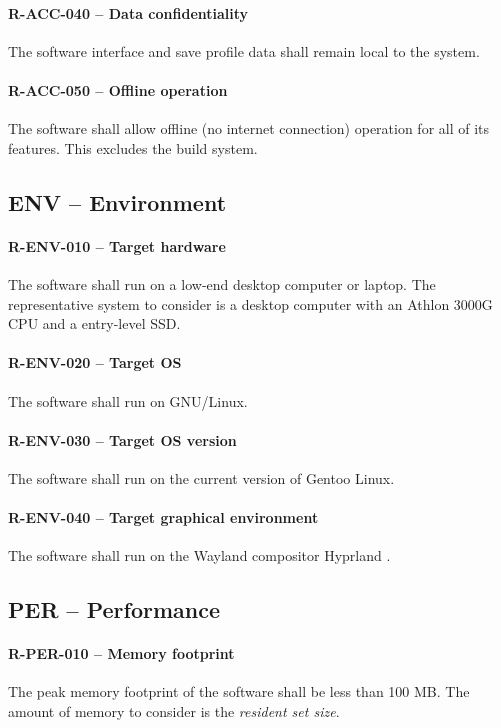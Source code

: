\paragraph{R-ACC-040 -- Data confidentiality}
The software interface and save profile data shall remain local to the system.

\paragraph{R-ACC-050 -- Offline operation}
The software shall allow offline (no internet connection) operation for all of
its features. This excludes the build system.

\subsection{ENV -- Environment}
\paragraph{R-ENV-010 -- Target hardware}
The software shall run on a low-end desktop computer or laptop.
The representative system to consider is a desktop computer with
an Athlon 3000G \gls{CPU} and a entry-level \gls{SSD}.

\paragraph{R-ENV-020 -- Target OS}
The software shall run on GNU/Linux.

\paragraph{R-ENV-030 -- Target OS version}
The software shall run on the current version of Gentoo Linux.

\paragraph{R-ENV-040 -- Target graphical environment}
The software shall run on the Wayland compositor Hyprland \cite{hyprland}.

\subsection{PER -- Performance}
\paragraph{R-PER-010 -- Memory footprint}
The peak memory footprint of the software shall be less than 100 MB.
The amount of memory to consider is the \emph{resident set size}.

